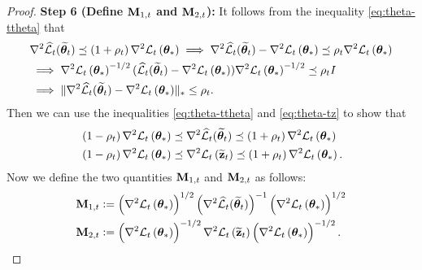 \begin{proof}
\textbf{Step 6 (Define $\mathbf{M}_{1, t}$ and $\mathbf{M}_{2, t}$):} It follows from the inequality \eqref{eq:theta-ttheta} that 
\begin{align*}
&\nabla^{2} \widehat{\cal L}_{t}(\widetilde{\bm{\theta}}_{t}) \preceq\left(1+\rho_t\right) \nabla^{2} {\cal L}_{t}\left(\bm{\theta}_{*}\right)
\implies \nabla^{2} \widehat{\cal L}_{t}(\widetilde{\bm{\theta}}_{t}) - \nabla^{2} {\cal L}_{t}\left(\bm{\theta}_{*}\right) \preceq \rho_t \nabla^{2} {\cal L}_{t}\left(\bm{\theta}_{*}\right) \\
&\implies \nabla^{2} {\cal L}_{t}\left(\bm{\theta}_{*}\right)^{-1/2}(\widehat{\cal L}_{t}(\widetilde{\bm{\theta}}_{t}) - \nabla^{2} {\cal L}_{t}\left(\bm{\theta}_{*}\right)) \nabla^{2} {\cal L}_{t}\left(\bm{\theta}_{*}\right)^{-1/2} \preceq \rho_t I
\\
&\implies \lVert \nabla^2\widehat{\cal L}_{t}(\widetilde{\bm{\theta}}_{t}) - \nabla^{2} {\cal L}_{t}\left(\bm{\theta}_{*}\right) \rVert_* \leq \rho_t.
\end{align*}
Then we can use the inequalities \eqref{eq:theta-ttheta} and \eqref{eq:theta-tz} to show that
\begin{align*}
&\left(1-\rho_t\right) \nabla^{2} {\cal L}_{t}\left(\bm{\theta}_{*}\right) \preceq \nabla^{2} \widehat{\cal L}_{t}(\widetilde{\bm{\theta}}_{t}) \preceq\left(1+\rho_t\right) \nabla^{2} {\cal L}_{t}\left(\bm{\theta}_{*}\right)\\
&\left(1-\rho_t\right) \nabla^{2} {\cal L}_{t}\left(\bm{\theta}_{*}\right) \preceq \nabla^{2} {\cal L}_{t}\left(\widetilde{\mathbf{z}}_{t}\right) \preceq\left(1+\rho_t\right) \nabla^{2} {\cal L}_{t}\left(\bm{\theta}_{*}\right).
\end{align*}
Now we define the two quantities $\mathbf{M}_{1, t}$ and $\mathbf{M}_{2, t}$ as follows:
\begin{align*}
\mathbf{M}_{1, t} &:= \left(\nabla^{2} {\cal L}_{t}\left(\bm{\theta}_{*}\right)\right)^{1 / 2}\left(\nabla^{2} \widehat{\cal L}_{t}(\widetilde{\bm{\theta}}_{t})\right)^{-1}\left(\nabla^{2} {\cal L}_{t}\left(\bm{\theta}_{*}\right)\right)^{1 / 2} \\
\mathbf{M}_{2, t} &:= \left(\nabla^{2} {\cal L}_{t}\left(\bm{\theta}_{*}\right)\right)^{-1 / 2} \nabla^{2} {\cal L}_{t}\left(\widetilde{\mathbf{z}}_{t}\right)\left(\nabla^{2} {\cal L}_{t}\left(\bm{\theta}_{*}\right)\right)^{-1 / 2}.
\end{align*}



\end{proof}
